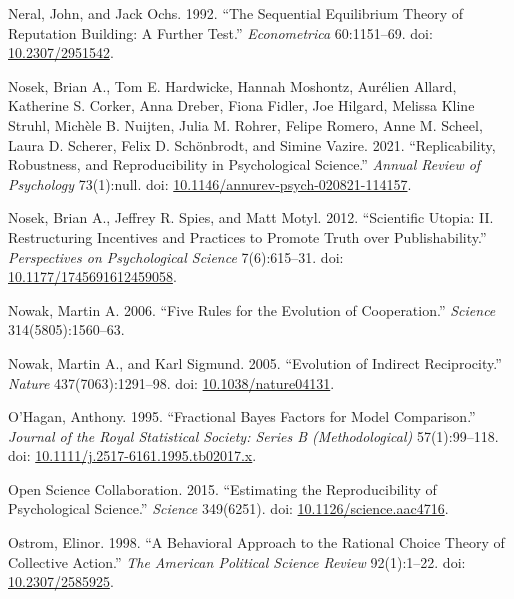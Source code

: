 \documentclass[
  11pt,
]{article}
\newlength{\cslhangindent}
\newlength{\cslentryspacingunit} %
\newenvironment{CSLReferences}[2] %
 {%
  \setlength{\parindent}{0pt}
  \ifodd #1
  \let\oldpar\par
  \def\par{\hangindent=\cslhangindent\oldpar}
  \fi
  \setlength{\parskip}{#2\cslentryspacingunit}
 }%
 {}
\begin{document}
\begin{CSLReferences}{1}{0}
\leavevmode{}%
Neral, John, and Jack Ochs. 1992. {``The Sequential Equilibrium Theory of Reputation Building: A Further Test.''} \emph{Econometrica} 60:1151--69. doi: \href{https://doi.org/10.2307/2951542}{10.2307/2951542}.

\leavevmode{}%
Nosek, Brian A., Tom E. Hardwicke, Hannah Moshontz, Aurélien Allard, Katherine S. Corker, Anna Dreber, Fiona Fidler, Joe Hilgard, Melissa Kline Struhl, Michèle B. Nuijten, Julia M. Rohrer, Felipe Romero, Anne M. Scheel, Laura D. Scherer, Felix D. Schönbrodt, and Simine Vazire. 2021. {``Replicability, Robustness, and Reproducibility in Psychological Science.''} \emph{Annual Review of Psychology} 73(1):null. doi: \href{https://doi.org/10.1146/annurev-psych-020821-114157}{10.1146/annurev-psych-020821-114157}.

\leavevmode{}%
Nosek, Brian A., Jeffrey R. Spies, and Matt Motyl. 2012. {``Scientific Utopia: II. Restructuring Incentives and Practices to Promote Truth over Publishability.''} \emph{Perspectives on Psychological Science} 7(6):615--31. doi: \href{https://doi.org/10.1177/1745691612459058}{10.1177/1745691612459058}.

\leavevmode{}%
Nowak, Martin A. 2006. {``Five Rules for the Evolution of Cooperation.''} \emph{Science} 314(5805):1560--63.

\leavevmode{}%
Nowak, Martin A., and Karl Sigmund. 2005. {``Evolution of Indirect Reciprocity.''} \emph{Nature} 437(7063):1291--98. doi: \href{https://doi.org/10.1038/nature04131}{10.1038/nature04131}.

\leavevmode{}%
O'Hagan, Anthony. 1995. {``Fractional Bayes Factors for Model Comparison.''} \emph{Journal of the Royal Statistical Society: Series B (Methodological)} 57(1):99--118. doi: \href{https://doi.org/10.1111/j.2517-6161.1995.tb02017.x}{10.1111/j.2517-6161.1995.tb02017.x}.

\leavevmode{}%
Open Science Collaboration. 2015. {``Estimating the Reproducibility of Psychological Science.''} \emph{Science} 349(6251). doi: \href{https://doi.org/10.1126/science.aac4716}{10.1126/science.aac4716}.

\leavevmode{}%
Ostrom, Elinor. 1998. {``A Behavioral Approach to the Rational Choice Theory of Collective Action.''} \emph{The American Political Science Review} 92(1):1--22. doi: \href{https://doi.org/10.2307/2585925}{10.2307/2585925}.


\end{CSLReferences}
\end{document}
